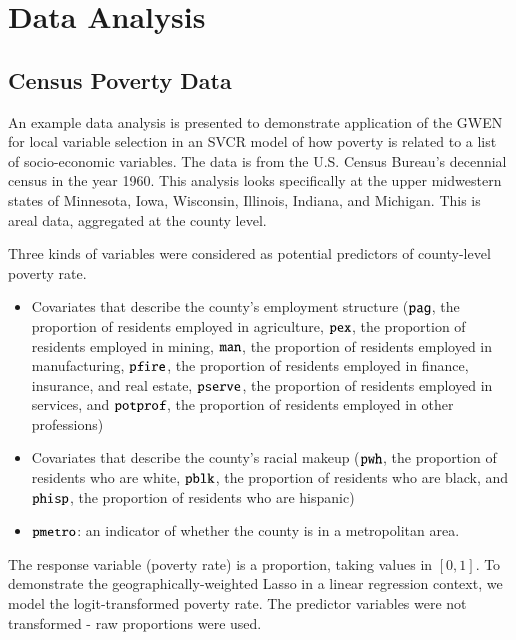 \documentclass[authoryear, review, 11pt]{elsarticle}
\begin{document}
	
	
	
				
	

			
\section{Data Analysis\label{section:data-analysis}}
	\subsection{Census Poverty Data}
	An example data analysis is presented to demonstrate application of the GWEN for local variable selection in an SVCR model of how poverty is related to a list of socio-economic variables. The data is from the U.S. Census Bureau's decennial census in the year 1960. This analysis looks specifically at the upper midwestern states of Minnesota, Iowa, Wisconsin, Illinois, Indiana, and Michigan. This is areal data, aggregated at the county level.
	
	Three kinds of variables  were considered as potential predictors of county-level poverty rate.
	\begin{itemize}
		\item Covariates that describe the county's employment structure ($\verb!pag!$, the proportion of residents employed in agriculture, $\verb!pex!$, the proportion of residents employed in mining, $\verb!man!$, the proportion of residents employed in manufacturing, $\verb!pfire!$, the proportion of residents employed in finance, insurance, and real estate, $\verb!pserve!$, the proportion of residents employed in services, and $\verb!potprof!$, the proportion of residents employed in other professions)\\
		\item Covariates that describe the county's racial makeup ($\verb!pwh!$, the proportion of residents who are white, $\verb!pblk!$, the proportion of residents who are black, and $\verb!phisp!$, the proportion of residents who are hispanic)\\
		\item $\verb!pmetro!$: an indicator of whether the county is in a metropolitan area.
	\end{itemize}
	The response variable (poverty rate) is a proportion, taking values in $[0,1]$. To demonstrate the geographically-weighted Lasso in a linear regression context, we model the logit-transformed poverty rate. The predictor variables were not transformed - raw proportions were used.
	
\end{document}

